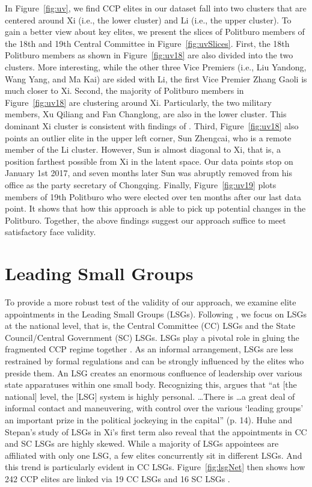\documentclass[11pt,english]{article}
\begin{document}
\begin{flushleft}
In Figure~\ref{fig:uv}, we find CCP elites in our dataset fall into two clusters that are centered around Xi (i.e., the lower cluster) and Li (i.e., the upper cluster). To gain a better view about key elites, we present the slices of Politburo members of the 18th and 19th Central Committee in Figure~\ref{fig:uvSlices}. First, the 18th Politburo members as shown in Figure~\ref{fig:uv18} are also divided into the two clusters. More interesting, while the other three Vice Premiers (i.e., Liu Yandong, Wang Yang, and Ma Kai) are sided with Li, the first Vice Premier Zhang Gaoli is much closer to Xi. Second, the majority of Politburo members in Figure~\ref{fig:uv18} are clustering around Xi. Particularly, the two military members, Xu Qiliang and Fan Changlong, are also in the lower cluster. This dominant Xi cluster is consistent with findings of \citet{Jaros2017}. Third, Figure~\ref{fig:uv18} also points an outlier elite in the upper left corner, Sun Zhengcai, who is a remote member of the Li cluster. However, Sun is almost diagonal to Xi, that is, a position farthest possible from Xi in the latent space. Our data points stop on January 1st 2017, and seven months later Sun was abruptly removed from his office as the party secretary of Chongqing. Finally, Figure~\ref{fig:uv19} plots members of 19th Politburo who were elected over ten months after our last data point. It shows that how this approach is able to pick up potential changes in the Politburo. Together, the above findings suggest our approach suffice to meet satisfactory face validity.

\section*{Leading Small Groups}

To provide a more robust test of the validity of our approach, we examine elite appointments in the Leading Small Groups (LSGs). Following \citet{Huhe2018a}, we focus on LSGs at the national level, that is, the Central Committee (CC) LSGs and the State Council/Central Government (SC) LSGs. LSGs play a pivotal role in gluing the fragmented CCP regime together \citep{Hamrin1992}. As an informal arrangement, LSGs are less restrained by formal regulations and can be strongly influenced by the elites who preside them. An LSG creates an enormous confluence of leadership over various state apparatuses within one small body. Recognizing this, \citet{Lieberthal1992a} argues that ``at {[}the national{]} level, the {[}LSG{]} system is highly personal. \ldots There is \ldots a great deal of informal contact and maneuvering, with control over the various `leading groups' an important prize in the political jockeying in the capital'' (p. 14). Huhe and Stepan's \citeyearpar{Huhe2018a} study of LSGs in Xi's first term also reveal that the appointments in CC and SC LSGs are highly skewed. While a majority of LSGs appointees are affiliated with only one LSG, a few elites concurrently sit in different LSGs. And this trend is particularly evident in CC LSGs. Figure~\ref{fig:lsgNet} then shows how 242 CCP elites are linked via 19 CC LSGs and 16 SC LSGs \citep{Batke2017,Huhe2018a}.


\end{flushleft}
\end{document}
